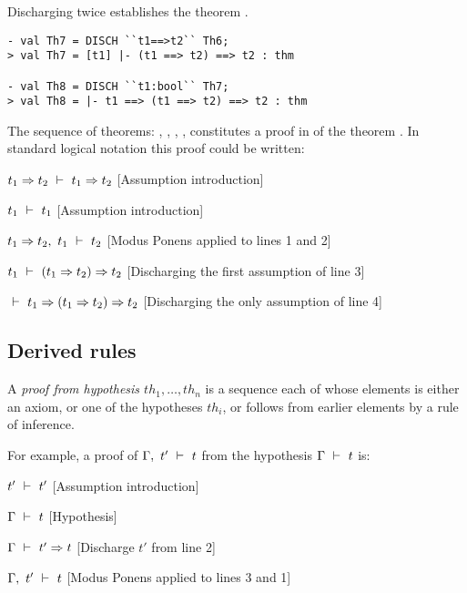 \noindent Discharging  twice establishes the theorem
.

\begin{session}\begin{verbatim}
- val Th7 = DISCH ``t1==>t2`` Th6;
> val Th7 = [t1] |- (t1 ==> t2) ==> t2 : thm

- val Th8 = DISCH ``t1:bool`` Th7;
> val Th8 = |- t1 ==> (t1 ==> t2) ==> t2 : thm
\end{verbatim}\end{session}

    The sequence of theorems: , , , ,
     constitutes a proof in \HOL{} of the theorem . In standard logical notation this proof
    could be written:

\begin{proofenumerate}
\item $ t_1\Rightarrow t_2\ \vdash\  t_1\Rightarrow t_2$ \hfill
[Assumption introduction]
\item $ t_1\ \vdash\  t_1$ \hfill
[Assumption introduction]
\item $ t_1\Rightarrow t_2,\ t_1 \ \vdash\  t_2 $ \hfill
[Modus Ponens applied to lines 1 and 2]
\item $ t_1 \ \vdash\  (t_1\Rightarrow t_2)\Rightarrow t_2$ \hfill
[Discharging the first assumption of line 3]
\item $ \ \vdash\  t_1 \Rightarrow (t_1 \Rightarrow t_2) \Rightarrow t_2$ \hfill
[Discharging the only assumption of line 4]
\end{proofenumerate}

\subsection{Derived rules}


A {\it proof from hypothesis $th_1, \ldots, th_n$} is a sequence each
of whose elements is either an axiom, or one of the hypotheses $th_i$,
or follows from earlier elements by a rule of inference.

For example, a proof of $\Gamma,\ t'\ \vdash\  t$ from the hypothesis
$\Gamma\ \vdash\  t$ is:


\begin{proofenumerate}
\item $ t'\ \vdash\  t'$ \hfill [Assumption introduction]
\item $ \Gamma\ \vdash\  t$ \hfill [Hypothesis]
\item $ \Gamma\ \vdash\  t'\Rightarrow t$ \hfill [Discharge $t'$ from line 2]
\item $ \Gamma,\ t'\ \vdash\  t$ \hfill [Modus Ponens applied to lines 3 and 1]
\end{proofenumerate}

